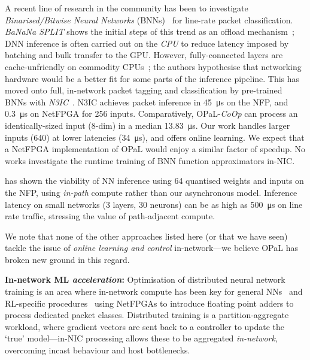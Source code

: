 \documentclass[
sigconf,natbib=false
]{acmart}
\newcommand{\fakepara}[1]{\noindent\textbf{#1:}}
\newcommand{\approachshort}{OPaL}
\newcommand{\Coopfw}{\emph{CoOp}}
\begin{document}
A recent line of research in the community has been to investigate \emph{Binarised/Bitwise Neural Networks} (BNNs)~\parencite{DBLP:conf/nips/HubaraCSEB16,DBLP:journals/corr/KimS16,DBLP:journals/corr/MiyashitaLM16} for line-rate packet classification.
\emph{BaNaNa SPLIT} shows the initial steps of this trend as an offload mechanism~\parencite{DBLP:conf/sigcomm/SanvitoSB18,DBLP:journals/corr/abs-1801-05731}; DNN inference is often carried out on the \emph{CPU} to reduce latency imposed by batching and bulk transfer to the GPU.
However, fully-connected layers are cache-unfriendly on commodity CPUs~\parencite{DBLP:conf/sigcomm/SanvitoSB18}; the authors hypothesise that networking hardware would be a better fit for some parts of the inference pipeline.
This has moved onto full, in-network packet tagging and classification by pre-trained BNNs with \emph{N3IC}~\parencite{DBLP:journals/corr/abs-2009-02353}.
N3IC achieves packet inference in \SI{45}{\micro\second} on the NFP, and \SI{0.3}{\micro\second} on NetFPGA for \SI{256}{\bit} inputs.
Comparatively, \approachshort{}-\Coopfw{} can process an identically-sized input (8-dim) in a median \SI{13.83}{\micro\second}.
Our work handles larger inputs (\SI{640}{\bit}) at lower latencies (\SI{34}{\micro\second}), and offers online learning.
We expect that a NetFPGA implementation of \approachshort{} would enjoy a similar factor of speedup.
No works investigate the runtime training of BNN function approximators in-NIC.

\textcite{langlet-ml-netronome} has shown the viability of NN inference using \SI{64}{\bit} quantised weights and inputs on the NFP, using \emph{in-path} compute rather than our asynchronous model.
Inference latency on small networks (3 layers, \num{30} neurons) can be as high as \SI{500}{\micro\second} on line rate traffic, stressing the value of path-adjacent compute.

We note that none of the other approaches listed here (or that we have seen) tackle the issue of \emph{online learning and control} in-network---we believe \approachshort{} has broken new ground in this regard.

\fakepara{In-network ML \emph{acceleration}}
Optimisation of distributed neural network training is an area where in-network compute has been key for general NNs~\parencite{DBLP:conf/micro/LiPAYQPWSEK18} and RL-specific procedures~\parencite{DBLP:conf/isca/LiLYCSH19} using NetFPGAs to introduce floating point adders to process dedicated packet classes.
Distributed training is a partition-aggregate workload, where gradient vectors are sent back to a controller to update the `true' model---in-NIC processing allows these to be aggregated \emph{in-network}, overcoming incast behaviour and host bottlenecks.
\end{document}
